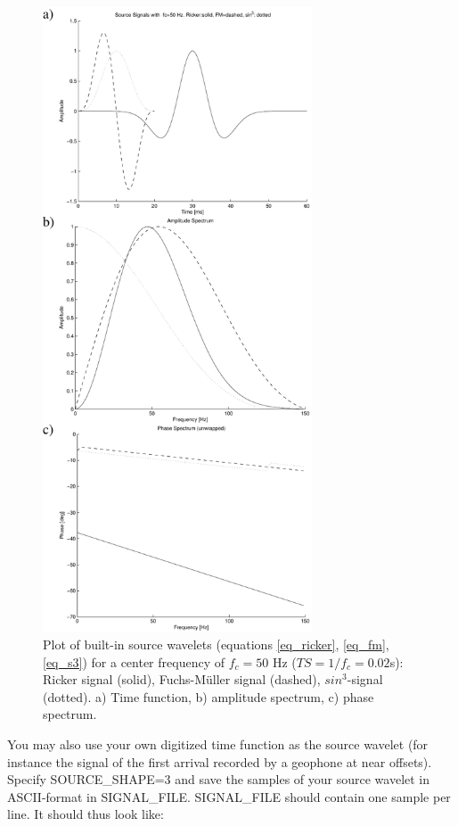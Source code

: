 \documentclass[11pt,onecolumn,oneside]{article}
\begin{document}
\begin{figure}
\begin{center}
\includegraphics[width=8cm,angle=0]{figures/signals.pdf}
\end{center}
\caption{Plot of built-in source wavelets (equations \ref{eq_ricker}, \ref{eq_fm}, \ref{eq_s3}) for a center frequency of $f_c=50$ Hz 
($TS=1/f_c=0.02$s): Ricker signal (solid), Fuchs-M\"uller signal (dashed), $sin^3$-signal (dotted). a) Time function, b) amplitude
spectrum, c) phase spectrum.}
\label{fig_source_wavelets}
\end{figure}

You may also use your own digitized time function as the source wavelet (for instance the signal of the first arrival recorded by a geophone at near offsets). Specify SOURCE\_SHAPE=3 and save the samples of your source wavelet in ASCII-format in SIGNAL\_FILE. SIGNAL\_FILE should contain one sample per line. It should thus look like:
\end{document}
